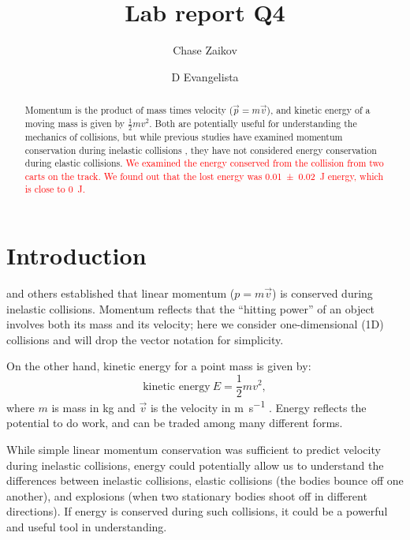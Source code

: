 \documentclass[aps,prl,preprint]{revtex4-1}
\begin{document}
\title{Lab report Q4}
\author{Chase Zaikov}
\author{D Evangelista}

\newcommand{\student}[1]{{\textcolor{red}{#1}}}

\begin{abstract}
Momentum is the product of mass times velocity ($\vec{p}=m\vec{v}$), and kinetic energy of a moving mass is given by $\frac{1}{2}mv^2$. Both are potentially useful for understanding the mechanics of collisions, but while previous studies have examined momentum conservation during inelastic collisions \cite{ortega-2021-momentum}, they have not considered energy conservation during elastic collisions. \student{We examined the energy conserved from the collision from two carts on the track. We found out that the lost energy was \qty{0.01\pm0.02}{\joule} energy, which is close to \qty{0}{\joule}. 
}\end{abstract}
\maketitle

\section{Introduction}
\cite{ortega-2021-momentum} and others established that linear momentum ($p=m\vec{v}$) is conserved during inelastic collisions. Momentum reflects that the ``hitting power'' of an object involves both its mass and its velocity; here we consider one-dimensional (1D) collisions and will drop the vector notation for simplicity.  

On the other hand, kinetic energy for a point mass is given by:
\begin{equation}
\text{kinetic energy}\ E = \frac{1}{2} m v^2,
\label{eq:energy}
\end{equation}
where $m$ is mass in \si{\kilo\gram} and $\vec{v}$ is the velocity in \si{\meter\per\second} \cite{duchatelet-1741-reponse, coriolis-1829-calcul}. Energy reflects the potential to do work, and can be traded among many different forms. 

While simple linear momentum conservation was sufficient to predict velocity during inelastic collisions, energy could potentially allow us to understand the differences between  inelastic collisions, elastic collisions (the bodies bounce off one another), and explosions (when two stationary bodies shoot off in different directions). If energy is conserved during such collisions, it could be a powerful and useful tool in understanding.
\end{document}
